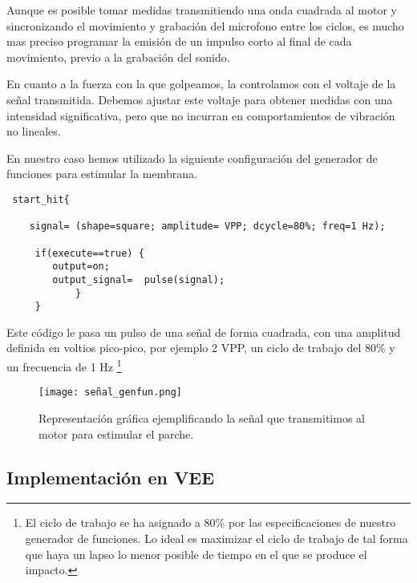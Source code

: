 \documentclass[journal, a4paper,onecolumn]{IEEEtran}
\begin{document}
Aunque es posible tomar medidas transmitiendo una onda cuadrada al motor y sincronizando el movimiento y grabación del microfono entre los ciclos, es mucho mas preciso programar la emisión de un impulso corto al final de cada movimiento, previo a la grabación del sonido. \newline

En cuanto a la fuerza con la que golpeamos, la controlamos con el voltaje de la señal transmitida. Debemos ajustar este voltaje para obtener medidas con una intensidad significativa, pero que no incurran en comportamientos de vibración no lineales.\newline

En nuestro caso hemos utilizado la siguiente configuración del generador de funciones para estimular la membrana.
\newline 

 \begin{lstlisting}
 start_hit{
 
    signal= (shape=square; amplitude= VPP; dcycle=80%; freq=1 Hz);
 
     if(execute==true) {
        output=on;
        output_signal=  pulse(signal);
            }
     }
 \end{lstlisting}

Este código le pasa un pulso de una señal de forma cuadrada, con una amplitud definida en voltios pico-pico, por ejemplo 2 VPP, un ciclo de trabajo del 80\% y un frecuencia de 1 Hz \footnote{El ciclo de trabajo se ha asignado a 80\% por las especificaciones de nuestro generador de funciones. Lo ideal es maximizar el ciclo de trabajo de tal forma que haya un lapso lo menor posible de tiempo en el que se produce el impacto.}

\begin{figure}[H]
    \centering
    \texttt{[image: señal\_genfun.png]}
    \caption{Representación gráfica ejemplificando la señal que transmitimos al motor para estimular el parche.}
    \label{pulsogenfun}
\end{figure}



  \subsection{Implementación en VEE}
  
\end{document}
